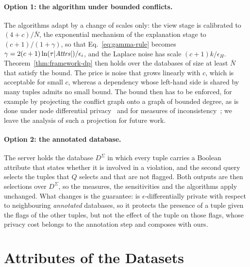 \paragraph{Option 1: the algorithm under bounded conflicts.}
The algorithms adapt by a change of scales only: the view stage is calibrated to $(4+c)/\bar N$, the exponential mechanism of the explanation stage to $(c+1)/(1+\gamma)$, so that Eq.~\eqref{eq:gamma-rule} becomes $\gamma=2(c+1)\ln(\tau|\mathit{Attrs}|)/\epsilon_i$, and the Laplace noise has scale $(c+1)k/\epsilon_H$.
Theorem~\ref{thm:framework-dp} then holds over the databases of size at least $\bar N$ that satisfy the bound.
The price is noise that grows linearly with $c$, which is acceptable for small $c$, whereas a dependency whose left-hand side is shared by many tuples admits no small bound.
The bound then has to be enforced, for example by projecting the conflict graph onto a graph of bounded degree, as is done under node differential privacy~\cite{KasiviswanathanNRS13,DayLL16} and for measures of inconsistency~\cite{MohapatraGHK25}; we leave the analysis of such a projection for future work.

\paragraph{Option 2: the annotated database.}
The server holds the database $D^\Sigma$ in which every tuple carries a Boolean attribute that states whether it is involved in a violation, and the second query selects the tuples that $Q$ selects and that are not flagged.
Both outputs are then selections over $D^\Sigma$, so the measures, the sensitivities and the algorithms apply unchanged.
What changes is the guarantee: \sys{} is $\epsilon$-differentially private with respect to neighbouring \emph{annotated} databases, so it protects the presence of a tuple given the flags of the other tuples, but not the effect of the tuple on those flags, whose privacy cost belongs to the annotation step and composes with ours.

\section{Attributes of the Datasets}
\label{app:attributes}




